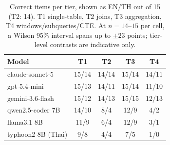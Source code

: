 \begin{table}[t]
\caption{Correct items per tier, shown as EN/TH out of 15 (T2: 14). T1
single-table, T2 joins, T3 aggregation, T4 windows/subqueries/CTE.
At $n{=}14$--$15$ per cell, a Wilson 95\% interval spans up to
$\pm23$ points;
tier-level contrasts are indicative only.}
\label{tab:tiers}
\centering\small
\begin{tabular}{lcccc}
\toprule
Model & T1 & T2 & T3 & T4 \\
\midrule
claude-sonnet-5 & 15/14 & 14/14 & 15/14 & 14/11 \\
gpt-5.4-mini & 15/13 & 14/11 & 15/14 & 11/10 \\
gemini-3.6-flash & 15/12 & 14/13 & 15/15 & 12/13 \\
qwen2.5-coder 7B & 14/10 & 8/4 & 12/9 & 4/2 \\
llama3.1 8B & 11/9 & 6/4 & 12/9 & 3/1 \\
typhoon2 8B (Thai) & 9/8 & 4/4 & 7/5 & 1/0 \\
\bottomrule
\end{tabular}
\end{table}
